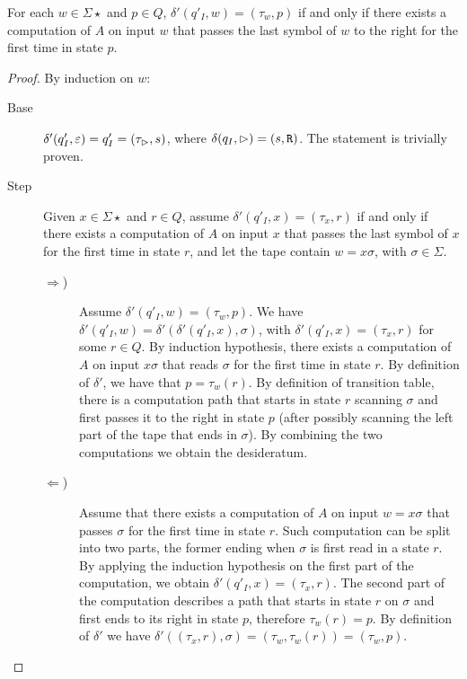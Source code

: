 \begin{lemm}\label{lem:transtab2DFA}
	For each $w\in\Sigma\star$ and $p\in Q$, $\delta'(q'_I,w)=(\tau_w,p)$ if and only if there exists a computation of $A$ on input $w$ that passes the last symbol of $w$ to the right for the first time in state $p$.
\end{lemm}
\begin{proof}
	By induction on $w$:
	\begin{description}
		\item[Base] $\delta'(q'_I,\varepsilon)=q'_I=(\tau_\rhd,s)$, where $\delta(q_I,\rhd)=(s,\mathtt R)$. The statement is trivially proven.
		\item[Step] Given $x\in\Sigma\star$ and $r\in Q$, assume $\delta'(q'_I,x)=(\tau_x,r)$ if and only if there exists a computation of $A$ on input $x$ that passes the last symbol of $x$ for the first time in state $r$, and let the tape contain $w=x\sigma$, with $\sigma\in\Sigma$.
		      \begin{description}
			      \item[$\Rightarrow$)] Assume $\delta'(q'_I,w)=(\tau_w,p)$.
			            We have $\delta'(q'_I,w)=\delta'(\delta'(q'_I,x),\sigma)$, with $\delta'(q'_I,x)=(\tau_x,r)$ for some $r\in Q$.
			            By induction hypothesis, there exists a computation of $A$ on input $x\sigma$ that reads $\sigma$ for the first time in state $r$.
			            By definition of $\delta'$, we have that $p=\tau_w(r)$.
			            By definition of transition table, there is a computation path that starts in state $r$ scanning $\sigma$ and first passes it to the right in state $p$ (after possibly scanning the left part of the tape that ends in $\sigma$).
			            By combining the two computations we obtain the desideratum.
			      \item[$\Leftarrow$)] Assume that there exists a computation of $A$ on input $w=x\sigma$ that passes $\sigma$ for the first time in state $r$.
			            Such computation can be split into two parts, the former ending when $\sigma$ is first read in a state $r$.
			            By applying the induction hypothesis on the first part of the computation, we obtain $\delta'(q'_I,x)=(\tau_x,r)$.
			            The second part of the computation describes a path that starts in state $r$ on $\sigma$ and first ends to its right in state $p$, therefore $\tau_w(r)=p$.
			            By definition of $\delta'$ we have $\delta'((\tau_x,r),\sigma)=(\tau_w,\tau_w(r))=(\tau_w,p)$.
		      \end{description}
	\end{description}
\end{proof}

